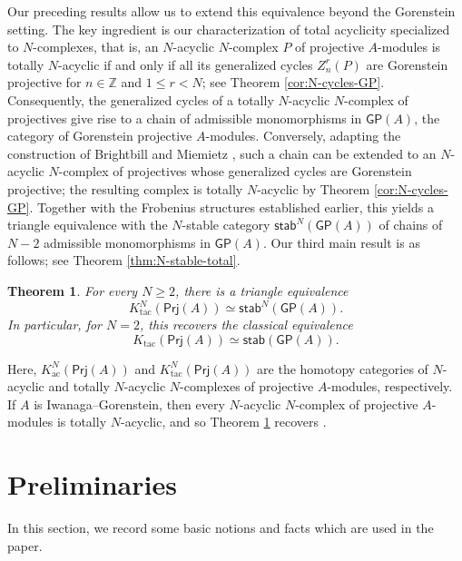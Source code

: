 \documentclass{amsart}
\newtheorem{intthm}{Theorem}[]
\theoremstyle{bfupright head,slanted body}
\theoremstyle{bfupright head,upright body}
\theoremstyle{fixed bf head,slanted body}
\theoremstyle{fixed bf head,upright body}
\theoremstyle{numbered paragraph}
\numberwithin{equation}{res}
\newcommand{\GP}[1]{\mathsf{GP}(#1)}
\newcommand{\Prj}[1]{\mathsf{Prj}(#1)}
\begin{document}
Our preceding results allow us to extend this equivalence beyond the Gorenstein setting. The key ingredient is our characterization of total acyclicity specialized to $N$-complexes, that is, an $N$-acyclic $N$-complex $P$ of projective $A$-modules is totally $N$-acyclic if and only if all its generalized cycles $Z_n^r(P)$ are Gorenstein projective for $n\in\mathbb Z$ and $1\leq r<N$; see Theorem \ref{cor:N-cycles-GP}. Consequently, the generalized cycles of a totally $N$-acyclic $N$-complex of projectives give rise to a chain of admissible monomorphisms in $\GP{A}$, the category of Gorenstein projective $A$-modules. Conversely, adapting the construction of Brightbill and Miemietz \cite[Proposition 4.5]{BM24}, such a chain can be
extended to an $N$-acyclic $N$-complex of projectives whose generalized cycles are Gorenstein projective; the resulting complex is totally $N$-acyclic by Theorem \ref{cor:N-cycles-GP}. Together with the Frobenius structures established earlier, this yields a triangle equivalence with the $N$-stable category $\mathsf{stab}^N(\GP{A})$ of chains of $N-2$ admissible monomorphisms in $\GP{A}$. Our third main result is as follows; see Theorem \ref{thm:N-stable-total}.

\begin{intthm}\label{thmC}
For every $N\geq2$, there is a triangle equivalence
$$K^N_{\mathrm{tac}}(\Prj A)\simeq
\mathsf{stab}^N(\GP{A}).$$
In particular, for $N=2$, this recovers the classical equivalence
$$K_{\mathrm{tac}}(\Prj A)\simeq\mathsf{stab}(\GP{A}).$$
\end{intthm}

Here, $K^N_{\mathrm{ac}}(\Prj A)$ and $K^N_{\mathrm{tac}}(\Prj A)$ are the homotopy categories of $N$-acyclic and totally $N$-acyclic $N$-complexes of projective $A$-modules, respectively. If $A$ is Iwanaga--Gorenstein, then every $N$-acyclic $N$-complex of projective $A$-modules is totally $N$-acyclic, and so Theorem \ref{thmC} recovers \cite[Theorem 4.12]{BM24}.

\section{Preliminaries}\label{property}
\noindent
In this section, we record some basic notions and facts which are used in the paper.
\end{document}
